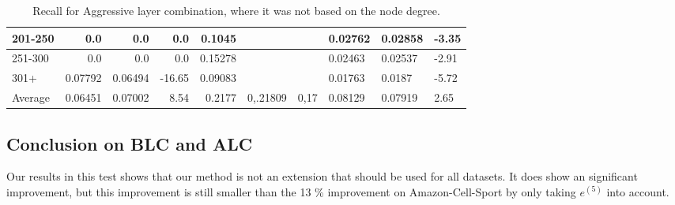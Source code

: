 \begin{table*}[]
\begin{tabular}{|l|r|r|r||r|r|r||l|l|l|}
        201-250   & 0.0                                     & 0.0                           & 0.0                              & 0.1045                     &                          &                            & 0.02762 & 0.02858 & -3.35 \\ \hline
        251-300   & 0.0                                     & 0.0                           & 0.0                              & 0.15278                    &                          &                            & 0.02463 & 0.02537 & -2.91 \\ \hline
        301+      & 0.07792                                 & 0.06494                       & -16.65                           & 0.09083                    &                          &                            & 0.01763 & 0.0187  & -5.72 \\ \hline
        Average   & 0.06451                                 & 0.07002                       & 8.54                             & 0.2177                     & 0,.21809                 & 0,17                       & 0.08129 & 0.07919 & 2.65  \\ \hline
    \end{tabular}
    \caption{Recall for Aggressive layer combination, where it was not based on the node degree.}
    \label{tab:aggressive-layer-combination-recall}
\end{table*}

\subsection{Conclusion on BLC and ALC}
Our results in this test shows that our method is not an extension that should be used for all datasets.
It does show an significant improvement, but this improvement is still smaller than the 13 \% improvement on Amazon-Cell-Sport by only taking $e^{(5)}$ into account.
